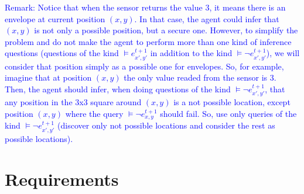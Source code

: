 \documentclass{tufte-handout}
\begin{document}
\begin{fullwidth}
\textcolor{blue}{Remark: Notice that when the sensor returns the value 3, it means there is
an envelope at current position $(x,y)$.
In that case, the agent could infer that $(x,y)$ is not only a possible position, but a secure
one. However, to simplify the problem and do not make the agent to perform more than one kind of inference questions (questions of the kind $\models e_{x',y'}^{t+1}$ in addition to the kind $\models \neg e_{x',y'}^{t+1}$), we will consider that position simply as a  possible one for envelopes. So, for example, imagine that at position $(x,y)$ the only value readed from the sensor is 3. Then, the agent should infer, when doing questions of the kind $\models \neg e_{x',y'}^{t+1}$, that any position in the 3x3 square around $(x,y)$ is a not possible location, except position $(x,y)$ where the query $\models \neg e_{x,y}^{t+1}$ should fail. So, use only queries of the kind $  \models \neg e_{x',y'}^{t+1}$ (discover only not possible locations and consider the rest as possible locations).  }
\end{fullwidth}


\section{Requirements}
\end{document}
